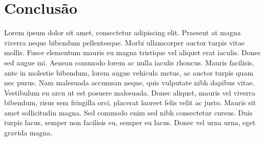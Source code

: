 \chapter{Conclusão}
\label{chap:conc}

Lorem ipsum dolor sit amet, consectetur adipiscing elit. Praesent at magna viverra neque bibendum pellentesque. Morbi ullamcorper auctor turpis vitae mollis. Fusce elementum mauris eu magna tristique vel aliquet erat iaculis. Donec sed augue mi. Aenean commodo lorem ac nulla iaculis rhoncus. Mauris facilisis, ante in molestie bibendum, lorem augue vehicula metus, ac auctor turpis quam nec purus. Nam malesuada accumsan neque, quis vulputate nibh dapibus vitae. Vestibulum eu arcu ut est posuere malesuada. Donec aliquet, mauris vel viverra bibendum, risus sem fringilla orci, placerat laoreet felis velit ac justo. Mauris sit amet sollicitudin magna. Sed commodo enim sed nibh consectetur cursus. Duis turpis lacus, semper non facilisis eu, semper eu lacus. Donec vel urna urna, eget gravida magna.
